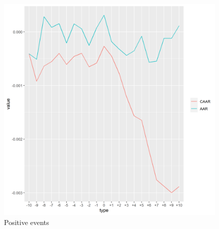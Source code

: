 \begin{figure}[!tbp]
\begin{minipage}[b]{0.45\textwidth}
    \includegraphics[scale=0.5]{Projekt/1.Figures analysis/ST_positive_all.png}
    \caption{Positive events}
  \end{minipage}
\end{figure}


